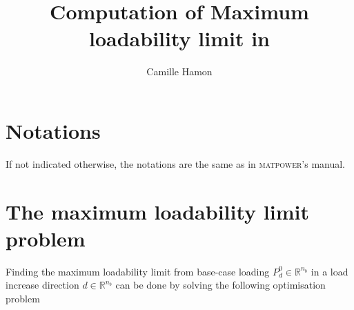 \documentclass[12pt,a4]{article}
\title{Computation of Maximum loadability limit in \matpower}
\author{Camille Hamon}
\newcommand*{\field}[1]{\mathbb{#1}}
\newcommand*{\R}{\field{R}} %
\newcommand*{\matpower}{\textsc{matpower}}
\begin{document}
\maketitle

\section{Notations}
\label{sec:notations}

If not indicated otherwise, the notations are the same as in \matpower's manual.

\section{The maximum loadability limit problem}
\label{sec:maxim-load-limit}

Finding the maximum loadability limit from base-case loading $P_d^0 \in \R^{n_b}$ in a load increase direction $d \in \R^{n_b}$ can be done by solving the following optimisation problem
\end{document}
